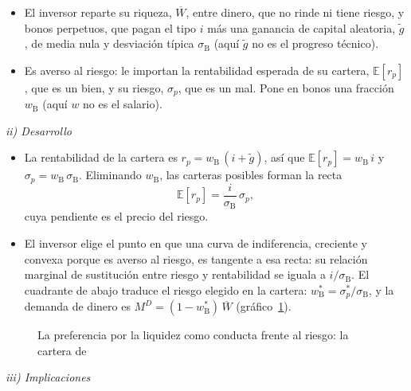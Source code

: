\documentclass[11pt]{article}
\begin{document}
\begin{itemize}
\item El inversor reparte su riqueza, $\overline{W}$, entre dinero, que no rinde ni tiene riesgo, y bonos perpetuos, que pagan el tipo $i$ más una ganancia de capital aleatoria, $\tilde g$, de media nula y desviación típica $\sigma_{\mathrm B}$ (aquí $\tilde g$ no es el progreso técnico).
\item Es averso al riesgo: le importan la rentabilidad esperada de su cartera, $\mathbb{E}[r_p]$, que es un bien, y su riesgo, $\sigma_p$, que es un mal. Pone en bonos una fracción $w_{\mathrm B}$ (aquí $w$ no es el salario).
\end{itemize}

\hspace*{3.6em}\emph{ii) Desarrollo}

\begin{itemize}
\item La rentabilidad de la cartera es $r_p=w_{\mathrm B}\,(i+\tilde g)$, así que $\mathbb{E}[r_p]=w_{\mathrm B}\,i$ y $\sigma_p=w_{\mathrm B}\,\sigma_{\mathrm B}$. Eliminando $w_{\mathrm B}$, las carteras posibles forman la recta
  \begin{equation}
  \mathbb{E}[r_p]=\frac{i}{\sigma_{\mathrm B}}\,\sigma_p, \label{eq:tobin}
  \end{equation}
  cuya pendiente es el precio del riesgo.
\item El inversor elige el punto en que una curva de indiferencia, creciente y convexa porque es averso al riesgo, es tangente a esa recta: su relación marginal de sustitución entre riesgo y rentabilidad se iguala a $i/\sigma_{\mathrm B}$. El cuadrante de abajo traduce el riesgo elegido en la cartera: $w^*_{\mathrm B}=\sigma^*_p/\sigma_{\mathrm B}$, y la demanda de dinero es $M^D=(1-w^*_{\mathrm B})\,\overline{W}$ (gráfico~\ref{fig:tobin}).
\end{itemize}

\begin{figure}[H]
\centering
\caption{La preferencia por la liquidez como conducta frente al riesgo: la cartera de }\label{fig:tobin}
\end{figure}

\hspace*{3.6em}\emph{iii) Implicaciones}
\end{document}

